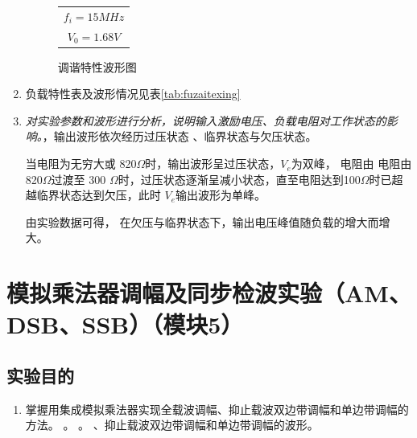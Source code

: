 \documentclass[12pt]{article}%
\numberwithin{equation}{section}
\begin{document}
\begin{enumerate}
\begin{figure}[htbp]
\begin{tabular}{cc}
\multicolumn{2}{c}{$f_i=15MHz$}\\
\multicolumn{2}{c}{$V_0=1.68V$}\\
\end{tabular}
\caption{调谐特性波形图}
\label{fig:bili2}
\end{figure}
\item 负载特性表及波形情况见表\ref{tab:fuzaitexing}
\item \emph{对实验参数和波形进行分析，说明输入激励电压、负载电阻对工作状态的影响。}，输出波形依次经历过压状态 、临界状态与欠压状态。\par
当电阻为无穷大或 820$\Omega$时，输出波形呈过压状态，$V_e$为双峰， 电阻由 电阻由 820$\Omega$过渡至 300 $\Omega$时，过压状态逐渐呈减小状态，直至电阻达到100$\Omega$时已超越临界状态达到欠压，此时 $V_e$输出波形为单峰。\par
由实验数据可得， 在欠压与临界状态下，输出电压峰值随负载的增大而增大。
\end{enumerate}
\section{模拟乘法器调幅及同步检波实验（AM、DSB、SSB）（模块5）}
\setcounter{equation}{0}
\setcounter{table}{0}
\setcounter{figure}{0}
\subsection{实验目的}
\begin{enumerate}\addtolength{\itemsep}{-1.5ex}
\item 掌握用集成模拟乘法器实现全载波调幅、抑止载波双边带调幅和单边带调幅的方法。
。
。
、抑止载波双边带调幅和单边带调幅的波形。
\end{enumerate}
\end{document}
